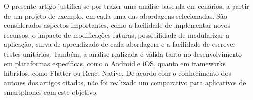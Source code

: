 O presente artigo justifica-se por trazer uma análise baseada em cenários, a partir de um projeto de exemplo, em cada uma das abordagens selecionadas.
São considerados aspectos importantes, como a facilidade de implementar novos recursos, o impacto de modificações futuras, possibilidade de modularizar a aplicação, curva de aprendizado de cada abordagem e a facilidade de escrever testes unitários.
Também, a análise realizada é válida tanto no desenvolvimento em plataformas específicas, como o Android e iOS, quanto em frameworks híbridos, como Flutter ou React Native.
De acordo com o conhecimento dos autores dos artigos citados, não foi realizado um comparativo para aplicativos de smartphones com este objetivo.